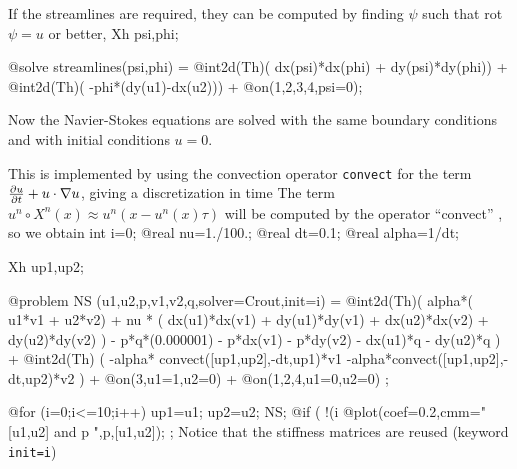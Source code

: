 \documentclass[a4paper,twoside,12pt]{book}
\def\p{\partial}
\begin{document}
\begin{example}
If the streamlines are required, they can be
computed by finding $\psi$ such that rot$\psi=u$ or better,
\bFF
Xh psi,phi;

@solve streamlines(psi,phi) =
      @int2d(Th)( dx(psi)*dx(phi) + dy(psi)*dy(phi))
   +  @int2d(Th)( -phi*(dy(u1)-dx(u2)))
   +  @on(1,2,3,4,psi=0);
\eFF

\bigskip

Now the Navier-Stokes equations are solved
\eq{
    {\p {u}\over\p t} +u\cdot\nabla u-\nu \Delta u+\nabla p=0,~~~ \nabla\cdot u=0
}
with the same boundary conditions and with initial conditions $u=0$.

This is implemented by using the convection operator \texttt{convect} for the term
${\p u\over\p t} +u\cdot\nabla u$, giving a discretization in time
The term $u^n\circ X^n(x)\approx u^n(x-u^n(x)\tau )$ will be
computed by the operator ``convect''  , so we obtain
\bFF
int i=0;
@real  nu=1./100.;
@real dt=0.1;
@real alpha=1/dt;

Xh up1,up2;

@problem  NS (u1,u2,p,v1,v2,q,solver=Crout,init=i) =
    @int2d(Th)(
             alpha*( u1*v1 + u2*v2)
            + nu * ( dx(u1)*dx(v1) + dy(u1)*dy(v1)
            +  dx(u2)*dx(v2) + dy(u2)*dy(v2) )
            - p*q*(0.000001)
            - p*dx(v1) - p*dy(v2)
            - dx(u1)*q - dy(u2)*q
           )
  + @int2d(Th) ( -alpha*
       convect([up1,up2],-dt,up1)*v1 -alpha*convect([up1,up2],-dt,up2)*v2 )
  + @on(3,u1=1,u2=0)
  + @on(1,2,4,u1=0,u2=0)
;

@for (i=0;i<=10;i++)
 {
   up1=u1;
   up2=u2;
   NS;
   @if ( !(i %
    @plot(coef=0.2,cmm=" [u1,u2] and p  ",p,[u1,u2]);
 } ;
\eFF
Notice that the stiffness matrices are 
reused (keyword
\texttt{init=i})
\end{example}
\end{document}
